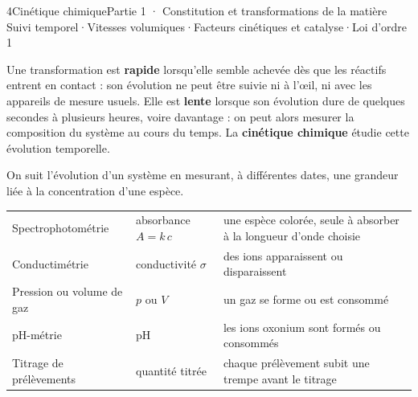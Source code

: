 \begin{ouverture}[cinetique]{4}{Cinétique chimique}{Partie 1 · Constitution et transformations de la matière}
{Suivi temporel\enspace·\enspace Vitesses volumiques\enspace·\enspace Facteurs cinétiques et catalyse\enspace·\enspace Loi d'ordre 1}
\end{ouverture}
\essentiel
{}
\begin{definition}
Une transformation est \textbf{rapide} lorsqu'elle semble achevée dès que les réactifs entrent en contact : son
évolution ne peut être suivie ni à l'œil, ni avec les appareils de mesure usuels. Elle est \textbf{lente} lorsque son
évolution dure de quelques secondes à plusieurs heures, voire davantage : on peut alors mesurer la composition du
système au cours du temps. La \textbf{cinétique chimique} étudie cette évolution temporelle.
\end{definition}
\begin{propriete}
On suit l'évolution d'un système en mesurant, à différentes dates, une grandeur liée à la concentration d'une espèce.
\par\smallskip
{\small\renewcommand{\arraystretch}{1.2}
\begin{tabularx}{\linewidth}{@{}llY@{}}\toprule
{} &  & \\\midrule
Spectrophotométrie & absorbance $A=k\,c$ & une espèce colorée, seule à absorber à la longueur d'onde choisie\\
Conductimétrie & conductivité $\sigma$ & des ions apparaissent ou disparaissent\\
Pression ou volume de gaz & $p$ ou $V$ & un gaz se forme ou est consommé\\
pH-métrie & pH & les ions oxonium sont formés ou consommés\\
Titrage de prélèvements & quantité titrée & chaque prélèvement subit une trempe avant le titrage\\\bottomrule
\end{tabularx}}
\end{propriete}
